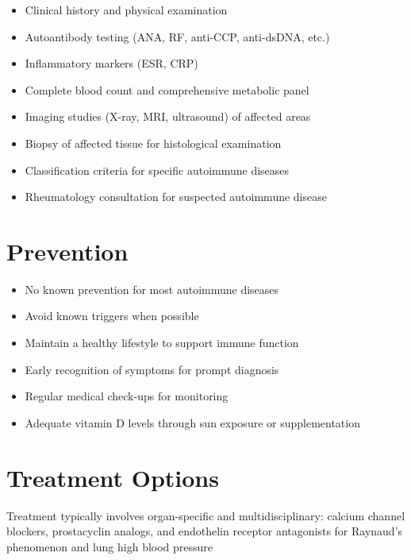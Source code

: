 \begin{itemize}[noitemsep]
  \item Clinical history and physical examination
  \item Autoantibody testing (ANA, RF, anti-CCP, anti-dsDNA, etc.)
  \item Inflammatory markers (ESR, CRP)
  \item Complete blood count and comprehensive metabolic panel
  \item Imaging studies (X-ray, MRI, ultrasound) of affected areas
  \item Biopsy of affected tissue for histological examination
  \item Classification criteria for specific autoimmune diseases
  \item Rheumatology consultation for suspected autoimmune disease
\end{itemize}
\section{Prevention}
\begin{itemize}[noitemsep]
  \item No known prevention for most autoimmune diseases
  \item Avoid known triggers when possible
  \item Maintain a healthy lifestyle to support immune function
  \item Early recognition of symptoms for prompt diagnosis
  \item Regular medical check-ups for monitoring
  \item Adequate vitamin D levels through sun exposure or supplementation
\end{itemize}
\section{Treatment Options}
Treatment typically involves organ-specific and multidisciplinary: calcium channel blockers, prostacyclin analogs, and endothelin receptor antagonists for Raynaud's phenomenon and lung high blood pressure

